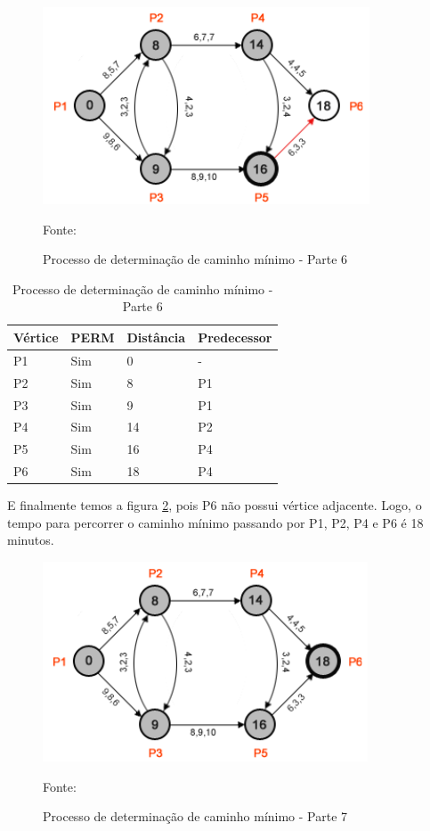 \begin{figure}[htbp]
\centering
 \includegraphics[width=.50\textwidth]{chapters/fig/leo7.png}
\caption{Processo de determinação de caminho mínimo - Parte 6}
Fonte: \cite{leonard}
\label{fig:leo7}
\end{figure}
\FloatBarrier
\begin{table}[htbp]
	\centering
	\begin{tabular}{l l l l}
	\toprule
	Vértice & PERM & Distância & Predecessor\\
	\midrule
	P1 & Sim & 0 & - \\
	P2 & Sim & 8 & P1 \\
	P3 & Sim & 9 & P1 \\
	P4 & Sim & 14 & P2 \\
	P5 & Sim & 16 & P4 \\
	P6 & Sim & 18 & P4 \\
	\bottomrule
	\end{tabular}
\caption{Processo de determinação de caminho mínimo - Parte 6}
 \label{tab:leotab5}
\end{table}
\FloatBarrier

E finalmente temos a figura \ref{fig:leo8}, pois P6 não possui vértice adjacente. Logo, o 
tempo para percorrer o caminho mínimo passando por P1, P2, P4 e P6 é 18 minutos.

\begin{figure}[htbp]
\centering
 \includegraphics[width=.50\textwidth]{chapters/fig/leo8.png}
\caption{Processo de determinação de caminho mínimo - Parte 7}
Fonte: \cite{leonard}
\label{fig:leo8}
\end{figure}
\FloatBarrier


